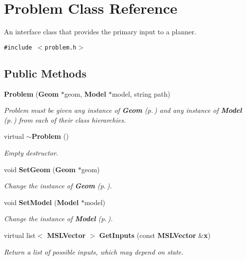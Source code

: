 \section{Problem  Class Reference}
\label{classProblem}
An interface class that provides the primary input to a planner. 


{\tt \#include $<$problem.h$>$}

\subsection*{Public Methods}
\begin{CompactItemize}
\item 
{\bf Problem} ({\bf Geom} $\ast$geom, {\bf Model} $\ast$model, string path)
\begin{CompactList}\small\item\em Problem must be given any instance of {\bf Geom} {\rm (p.\,\pageref{classGeom})} and any instance of {\bf Model} {\rm (p.\,\pageref{classModel})} from each of their class hierarchies.\item\end{CompactList}\item 
virtual {\bf $\sim$Problem} ()
\begin{CompactList}\small\item\em Empty destructor.\item\end{CompactList}\item 
void {\bf Set\-Geom} ({\bf Geom} $\ast$geom)
\begin{CompactList}\small\item\em Change the instance of {\bf Geom} {\rm (p.\,\pageref{classGeom})}.\item\end{CompactList}\item 
void {\bf Set\-Model} ({\bf Model} $\ast$model)
\begin{CompactList}\small\item\em Change the instance of {\bf Model} {\rm (p.\,\pageref{classModel})}.\item\end{CompactList}\item 
virtual list$<$ {\bf MSLVector} $>$ {\bf Get\-Inputs} (const {\bf MSLVector} \&{\bf x})
\begin{CompactList}\small\item\em Return a list of possible inputs, which may depend on state.\item\end{CompactList}\item 

\end{CompactItemize}

